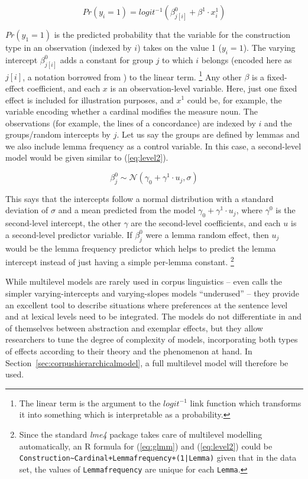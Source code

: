 \begin{equation}
  Pr(y_i=1)=logit^{-1}(\beta^0_{j[i]}+\beta^1\cdot x^1_i)
  \label{eq:glmm}
\end{equation}

$Pr(y_1=1)$ is the predicted probability that the variable for the construction type in an observation (indexed by $i$) takes on the value 1 ($y_i=1$).
The varying intercept $\beta^0_{j[i]}$ adds a constant for group $j$ to which $i$ belongs (encoded here as $j[i]$, a notation borrowed from \citealp{GelmanHill2006}) to the linear term.%
\footnote{The linear term is the argument to the $logit^{-1}$ link function which transforms it into something which is interpretable as a probability.}
Any other $\beta$ is a fixed-effect coefficient, and each $x$ is an observation-level variable.
Here, just one fixed effect is included for illustration purposes, and $x^1$ could be, for example, the variable encoding whether a cardinal modifies the measure noun.
The observations (for example, the lines of a concordance) are indexed by $i$ and the groups\slash random intercepts by $j$.
Let us say the groups are defined by lemmas and we also include lemma frequency as a control variable.
In this case, a second-level model would be given similar to (\ref{eq:level2}).

\begin{equation}
  \beta^0_j\sim\mathcal{N}(\gamma_0+\gamma^1\cdot u_j, \sigma)
  \label{eq:level2}
\end{equation}

This says that the intercepts follow a normal distribution with a standard deviation of $\sigma$ and a mean predicted from the model $\gamma_0+\gamma^1\cdot u_j$, where $\gamma^0$ is the second-level intercept, the other $\gamma$ are the second-level coefficients, and each $u$ is a second-level predictor variable.
If $\beta^0_{j}$ were a lemma random effect, then $u_j$ would be the lemma frequency predictor which helps to predict the lemma intercept instead of just having a simple per-lemma constant.%
\footnote{Since the standard \textit{lme4} package takes care of multilevel modelling automatically, an R formula for (\ref{eq:glmm}) and (\ref{eq:level2}) could be \texttt{Construction\textasciitilde Cardinal+Lemmafrequency+(1|Lemma)} given that in the data set, the values of \texttt{Lemmafrequency} are unique for each \texttt{Lemma}.}

While multilevel models are rarely used in corpus linguistics -- \citet{Gries2015} even calls the simpler varying-intercepts and varying-slopes models ``underused'' -- they provide an excellent tool to describe situations where preferences at the sentence level and at lexical levels need to be integrated.
The models do not differentiate in and of themselves between abstraction and exemplar effects, but they allow researchers to tune the degree of complexity of models, incorporating both types of effects according to their theory and the phenomenon at hand.
In Section~\ref{sec:corpushierarchicalmodel}, a full multilevel model will therefore be used.
